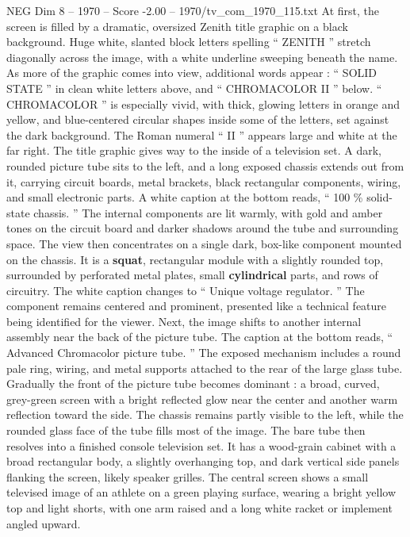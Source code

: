 \begin{textsample}{NEG Dim 8 – 1970 – Score -2.00 – 1970/tv\_com\_1970\_115.txt}  \label{ex:f8_neg_063}
At first, the screen is filled by a dramatic, oversized Zenith title graphic on a black background.
Huge white, slanted block letters spelling “ ZENITH ” stretch diagonally across the image, with a white underline sweeping beneath the name.
As more of the graphic comes into view, additional words appear : “ SOLID STATE ” in clean white letters above, and “ CHROMACOLOR II ” below. “ CHROMACOLOR ” is especially vivid, with thick, glowing letters in orange and yellow, and blue-centered circular shapes inside some of the letters, set against the dark background.
The Roman numeral “ II ” appears large and white at the far right.
The title graphic gives way to the inside of a television set.
A dark, rounded picture tube sits to the left, and a long exposed chassis extends out from it, carrying circuit boards, metal brackets, black rectangular components, wiring, and small electronic parts.
A white caption at the bottom reads, “ 100 \% solid-state chassis. ” The internal components are lit warmly, with gold and amber tones on the circuit board and darker shadows around the tube and surrounding space.
The view then concentrates on a single dark, box-like component mounted on the chassis.
It is a \textbf{squat}, rectangular module with a slightly rounded top, surrounded by perforated metal plates, small \textbf{cylindrical} parts, and rows of circuitry.
The white caption changes to “ Unique voltage regulator. ” The component remains centered and prominent, presented like a technical feature being identified for the viewer.
Next, the image shifts to another internal assembly near the back of the picture tube.
The caption at the bottom reads, “ Advanced Chromacolor picture tube. ” The exposed mechanism includes a round pale ring, wiring, and metal supports attached to the rear of the large glass tube.
Gradually the front of the picture tube becomes dominant : a broad, curved, grey-green screen with a bright reflected glow near the center and another warm reflection toward the side.
The chassis remains partly visible to the left, while the rounded glass face of the tube fills most of the image.
The bare tube then resolves into a finished console television set.
It has a wood-grain cabinet with a broad rectangular body, a slightly overhanging top, and dark vertical side panels flanking the screen, likely speaker grilles.
The central screen shows a small televised image of an athlete on a green playing surface, wearing a bright yellow top and light shorts, with one arm raised and a long white racket or implement angled upward.

\end{textsample}
